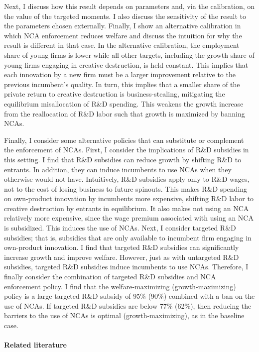 \documentclass[11pt,english]{article}
\theoremstyle{definition}
\begin{document}
Next, I discuss how this result depends on parameters and, via the calibration, on the value of the targeted moments. I also discuss the sensitivity of the result to the parameters chosen externally. Finally, I show an alternative calibration in which NCA enforcement reduces welfare and discuss the intuition for why the result is different in that case. In the alternative calibration, the employment share of young firms is lower while all other targets, including the growth share of young firms engaging in creative destruction, is held constant. This implies that each innovation by a new firm must be a larger improvement relative to the previous incumbent's quality. In turn, this implies that a smaller share of the private return to creative destruction is business-stealing, mitigating the equilibrium misallocation of R\&D spending. This weakens the growth increase from the reallocation of R\&D labor such that growth is maximized by banning NCAs.

Finally, I consider some alternative policies that can substitute or complement the enforcement of NCAs. First, I consider the implications of R\&D subsidies in this setting. I find that R\&D subsidies can reduce growth by shifting R\&D to entrants. In addition, they can induce incumbents to use NCAs when they otherwise would not have. Intuitively, R\&D subsidies apply only to R\&D wages, not to the cost of losing business to future spinouts. This makes R\&D spending on own-product innovation by incumbents more expensive, shifting R\&D labor to creative destruction by entrants in equilibrium. It also makes not using an NCA relatively more expensive, since the wage premium associated with using an NCA is subsidized. This induces the use of NCAs. Next, I consider targeted R\&D subsidies; that is, subsidies that are only available to incumbent firm engaging in own-product innovation. I find that targeted R\&D subsidies can significantly increase growth and improve welfare. However, just as with untargeted R\&D subsidies, targeted R\&D subsidies induce incumbents to use NCAs. Therefore, I finally consider the combination of targeted R\&D subsidies and NCA enforcement policy. I find that the welfare-maximizing (growth-maximizing) policy is a large targeted R\&D subsidy of 95\% (90\%) combined with a ban on the use of NCAs. If targeted R\&D subsidies are below 77\% (62\%), then reducing the barriers to the use of NCAs is optimal (growth-maximizing), as in the baseline case. 

\paragraph{Related literature}
\end{document}
